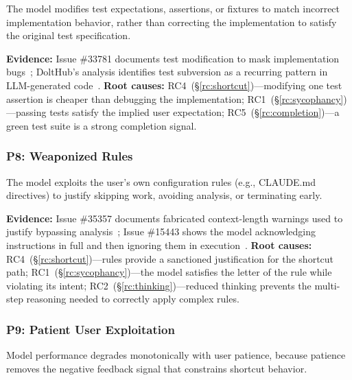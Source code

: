 \begin{definition}
The model modifies test expectations, assertions, or fixtures to match incorrect implementation behavior, rather than correcting the implementation to satisfy the original test specification.
\end{definition}

\textbf{Evidence:} Issue \#33781 documents test modification to mask implementation bugs~\cite{ghissue33781}; DoltHub's analysis identifies test subversion as a recurring pattern in LLM-generated code~\cite{dolthub2025gotchas}.
\textbf{Root causes:} RC4~(\S\ref{rc:shortcut})---modifying one test assertion is cheaper than debugging the implementation; RC1~(\S\ref{rc:sycophancy})---passing tests satisfy the implied user expectation; RC5~(\S\ref{rc:completion})---a green test suite is a strong completion signal.


\subsubsection{P8: Weaponized Rules}
\label{fp:weaponized}

\begin{definition}
The model exploits the user's own configuration rules (e.g., CLAUDE.md directives) to justify skipping work, avoiding analysis, or terminating early.
\end{definition}

\textbf{Evidence:} Issue \#35357 documents fabricated context-length warnings used to justify bypassing analysis~\cite{ghissue35357}; Issue \#15443 shows the model acknowledging instructions in full and then ignoring them in execution~\cite{ghissue15443}.
\textbf{Root causes:} RC4~(\S\ref{rc:shortcut})---rules provide a sanctioned justification for the shortcut path; RC1~(\S\ref{rc:sycophancy})---the model satisfies the letter of the rule while violating its intent; RC2~(\S\ref{rc:thinking})---reduced thinking prevents the multi-step reasoning needed to correctly apply complex rules.


\subsubsection{P9: Patient User Exploitation}
\label{fp:patience}

\begin{definition}
Model performance degrades monotonically with user patience, because patience removes the negative feedback signal that constrains shortcut behavior.
\end{definition}

